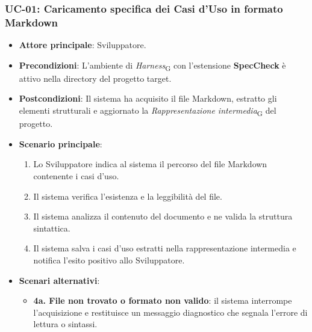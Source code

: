 \documentclass[11pt, a4paper]{article}
\newcommand{\glossario}[1]{\textit{#1}\textsubscript{G}}
\newenvironment{schedauc}[2]{%
    \subsubsection{#1: #2}%
    \begin{itemize}[leftmargin=1.5em, itemsep=0.3em]%
}{%
    \end{itemize}%
    \vspace{0.6em}%
}
\begin{document}
\begin{schedauc}{UC-01}{Caricamento specifica dei Casi d'Uso in formato Markdown}
    \item \textbf{Attore principale}: Sviluppatore.
    \item \textbf{Precondizioni}: L'ambiente di \glossario{Harness} con l'estensione \textbf{SpecCheck} è attivo nella directory del progetto target.
    \item \textbf{Postcondizioni}: Il sistema ha acquisito il file Markdown, estratto gli elementi strutturali e aggiornato la \glossario{Rappresentazione intermedia} del progetto.
    \item \textbf{Scenario principale}:
    \begin{enumerate}
        \item Lo Sviluppatore indica al sistema il percorso del file Markdown contenente i casi d'uso.
        \item Il sistema verifica l'esistenza e la leggibilità del file.
        \item Il sistema analizza il contenuto del documento e ne valida la struttura sintattica.
        \item Il sistema salva i casi d'uso estratti nella rappresentazione intermedia e notifica l'esito positivo allo Sviluppatore.
    \end{enumerate}
    \item \textbf{Scenari alternativi}:
    \begin{itemize}
        \item \textbf{4a. File non trovato o formato non valido}: il sistema interrompe l'acquisizione e restituisce un messaggio diagnostico che segnala l'errore di lettura o sintassi.
    \end{itemize}
\end{schedauc}
\end{document}
